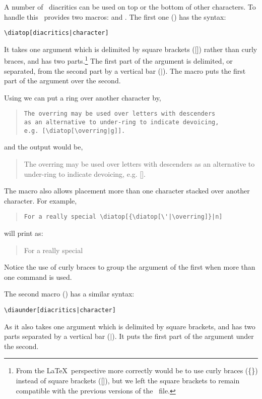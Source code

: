 A number of \wsu\ diacritics can be used on top or the bottom of other
characters. To handle this \ipas\ provides two macros:  and
. The first one () has the syntax:
%
\begin{center}
\verb+\diatop[diacritics|character]+
\end{center}
%
It takes one argument which is delimited by square brackets ([])
rather than curly braces, and has two parts.\footnote{From the \LaTeX\
perspective more correctly would be to use curly braces (\{\}) instead
of square brackets ([]), but we left the square brackets to remain
compatible with the previous versions of the \ipam\ file.}
%
The first part of the argument is delimited, or separated, from the
second part by a vertical bar ($\vert$). The macro \B{diatop} puts the
first part of the argument over the second.

Using  we can put a ring over another character by,
%
\begin{quote}\begin{verbatim}
The overring may be used over letters with descenders
as an alternative to under-ring to indicate devoicing,
e.g. [\diatop[\overring|g]].
\end{verbatim}\end{quote}
%
and the output would be,
%
\begin{quote}
The overring may be used over letters with descenders as an
alternative to under-ring to indicate devoicing, e.g.
[\diatop[\overring|g]].
\end{quote}

The  macro also allows placement more than one character
stacked over another character. For example,
%
\begin{quote}\begin{verbatim}
For a really special \diatop[{\diatop[\'|\overring]}|n]
\end{verbatim}\end{quote}
%
will print as:
%
\begin{quote}
For a really special \diatop[{\diatop[\'|\overring]}|n]
\end{quote}
%
Notice the use of curly braces to group the argument of the first 
when more than one \B{diatop} command is used.

The second macro () has a similar syntax:
%
\begin{center}
\verb+\diaunder[diacritics|character]+
\end{center}
%
As  it also takes one argument which is delimited by square
brackets, and has two parts separated by a vertical bar ($\vert$). It
puts the first part of the argument under the second.


